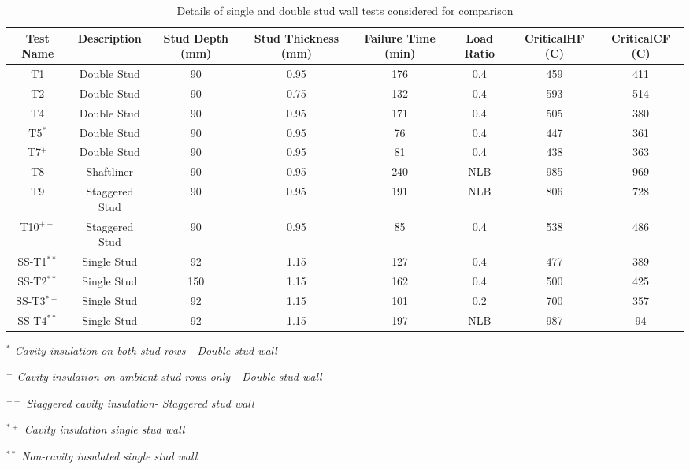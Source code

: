 \begin{table}
	\begin{threeparttable}
		\centering
		\caption{Details of single and double stud wall tests considered for comparison}
		\begin{tabular}{cccccccc}
			\toprule
			\multicolumn{1}{p{2.5em}}{\centering Test Name} & 
			\multicolumn{1}{p{5.3em}}{\centering Description} & 
			\multicolumn{1}{p{2.5em}}{\centering Stud Depth (mm)} & 
			\multicolumn{1}{p{4.3em}}{\centering Stud Thickness (mm)} & 
			\multicolumn{1}{p{2.5em}}{\centering Failure Time (min)} & 
			\multicolumn{1}{p{2.5em}}{\centering Load Ratio} & 
			\multicolumn{1}{p{3.3em}}{\centering Critical\newline{}HF \centering \newline{}(\degree C)} & 
			\multicolumn{1}{p{3.3em}}{\centering Critical\newline{}CF \centering \newline{}(\degree C)} \\
			\midrule
			T1 & Double Stud & 90 & 0.95 & 176 & 0.4  & 459 & 411 \\
			T2 & Double Stud & 90 & 0.75 & 132 & 0.4  & 593 & 514 \\
			T4 & Double Stud & 90 & 0.95 & 171 & 0.4  & 505 & 380 \\
			T5\(^{*}\) & Double Stud & 90 & 0.95 & 76 & 0.4  & 447 & 361 \\
			T7\(^{+}\) & Double Stud & 90 & 0.95 & 81 & 0.4  & 438 & 363 \\
			T8 & Shaftliner & 90 & 0.95 & 240 & NLB  & 985 & 969 \\
			T9 & Staggered Stud & 90 & 0.95 & 191 & NLB  & 806 & 728 \\
			T10\(^{++}\) & Staggered Stud & 90 & 0.95 & 85 & 0.4  & 538 & 486 \\
			SS-T1\(^{**}\) & Single Stud & 92 & 1.15 & 127 & 0.4  & 477 & 389 \\
			SS-T2\(^{**}\) & Single Stud & 150 & 1.15 & 162 & 0.4  & 500 & 425 \\
			SS-T3\(^{*+}\) & Single Stud & 92 & 1.15 & 101 & 0.2  & 700 & 357 \\
			SS-T4\(^{**}\) & Single Stud & 92 & 1.15 & 197 & NLB  & 987 & 94 \\
			\bottomrule
		\end{tabular}
			\label{tab:comparison-single}
				\begin{tablenotes}
					\small
					\item \textit{\(^{*}\) Cavity insulation on both stud rows - Double stud wall}
					\item \textit{\(^{+}\) Cavity insulation on ambient stud rows only - Double stud wall}
					\item \textit{\(^{++}\) Staggered cavity insulation- Staggered stud wall}
					\item \textit{\(^{*+}\) Cavity insulation single stud wall}
					\item \textit{\(^{**}\) Non-cavity insulated single stud wall}
				\end{tablenotes}
	\end{threeparttable}
\end{table}


